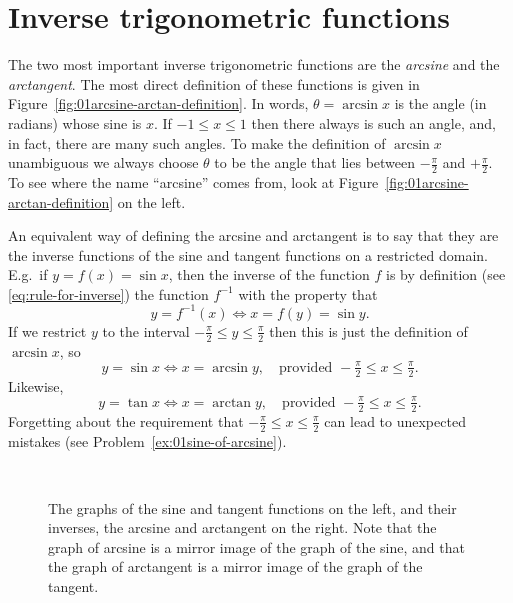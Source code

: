 \section{Inverse trigonometric functions}
The two most important inverse trigonometric functions are the \emph{arcsine}
and the \emph{arctangent}.  The most direct definition of these functions is
given in Figure~\ref{fig:01arcsine-arctan-definition}.  In words, $\theta =
\arcsin x$ is the angle (in radians) whose sine is $x$.  If $-1\leq x\leq 1$
then there always is such an angle, and, in fact, there are many such angles.
To make the definition of $\arcsin x$ unambiguous we always choose $\theta$ to
be the angle that lies between $-\frac\pi2$ and $+\frac\pi2$.  To see where the
name ``arcsine'' comes from, look at
Figure~\ref{fig:01arcsine-arctan-definition} on the left.


An equivalent way of defining the arcsine and arctangent is to say that they are
the inverse functions of the sine and tangent functions on a restricted domain.
E.g.~if $y=f(x) = \sin x$, then the inverse of the function $f$ is by definition
(see \eqref{eq:rule-for-inverse}) the function $f^{-1}$ with the property that
\[
y =f^{-1}(x) \iff x = f(y) = \sin y.
\]
If we restrict $y$ to the interval $-\frac\pi2\leq y \leq \frac\pi2$ then this
is just the definition of $\arcsin x$, so
\[
y =\sin x \iff x=\arcsin y, \quad \text{provided } -\tfrac\pi2 \leq x\leq \tfrac
\pi2.
\]
Likewise,
\[
y =\tan x \iff x=\arctan y, \quad \text{provided } -\tfrac\pi2 \leq x\leq \tfrac
\pi2.
\]
Forgetting about the requirement that $-\frac\pi2 \leq x\leq \frac \pi2$ can
lead to unexpected mistakes (see Problem~\ref{ex:01sine-of-arcsine}).

\begin{figure}[t]
  \begin{center}
    \parbox{0.6\textwidth}{}%
    \parbox{0.38\textwidth}{}\\
    \parbox{0.6\textwidth}{}%
    \parbox{0.38\textwidth}{}
  \end{center}
  \caption{The graphs of the sine and tangent functions on the left, and their
    inverses, the arcsine and arctangent on the right.  Note that the graph of
    arcsine is a mirror image of the graph of the sine, and that the graph of
    arctangent is a mirror image of the graph of the tangent.  }
  \label{fig:01sine-and-arcsine}
\end{figure}%



